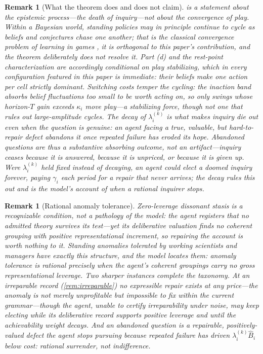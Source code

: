 \documentclass[11pt]{article}
\newtheorem{remark}[assumption]{Remark}
\theoremstyle{definition}
\begin{document}
\begin{remark}[What the theorem does and does not claim]
\label{rem:scope}
 is a statement about the epistemic process---the death of inquiry---not about the convergence of play.
Within a Bayesian world, standing policies may in principle continue to cycle as beliefs and conjectures chase one another; that is the classical convergence problem of learning in games \citep{FudenbergLevine1993,KalaiLehrer1993a}, it is orthogonal to this paper's contribution, and the theorem deliberately does not resolve it.
Part (d) and the rest-point characterization are accordingly conditional on play stabilizing, which in every configuration featured in this paper is immediate: their beliefs make one action per cell strictly dominant.
Switching costs temper the cycling: the inaction band absorbs belief fluctuations too small to be worth acting on, so only swings whose horizon-$T$ gain exceeds $\kappa_i$ move play---a stabilizing force, though not one that rules out large-amplitude cycles.
The decay of $\lambda_i^{(k)}$ is what makes inquiry die out even when the question is genuine: an agent facing a true, valuable, but hard-to-repair defect abandons it once repeated failure has eroded its hope.
Abandoned questions are thus a substantive absorbing outcome, not an artifact---inquiry ceases because it is answered, because it is unpriced, or because it is given up.
Were $\lambda_i^{(k)}$ held fixed instead of decaying, an agent could elect a doomed inquiry forever, paying $\gamma_i$ each period for a repair that never arrives; the decay rules this out and is the model's account of when a rational inquirer stops.
\end{remark}

\begin{remark}[Rational anomaly tolerance]
\label{rem:anomaly}
Zero-leverage dissonant stasis is a recognizable condition, not a pathology of the model: the agent registers that no admitted theory survives its test---yet its deliberative valuation finds no coherent grouping with positive representational increment, so repairing the account is worth nothing to it.
Standing anomalies tolerated by working scientists and managers have exactly this structure, and the model locates them: anomaly tolerance is rational precisely when the agent's coherent groupings carry no gross representational leverage.
Two sharper instances complete the taxonomy.
At an irreparable record (\cref{rem:irreparable}) no expressible repair exists at any price---the anomaly is not merely unprofitable but impossible to fix within the current grammar---though the agent, unable to certify irreparability under noise, may keep electing while its deliberative record supports positive leverage and until the achievability weight decays.
And an \emph{abandoned question} is a repairable, positively-valued defect the agent stops pursuing because repeated failure has driven $\lambda_i^{(k)}\widehat B_i$ below cost: rational surrender, not indifference.
\end{remark}
\end{document}
